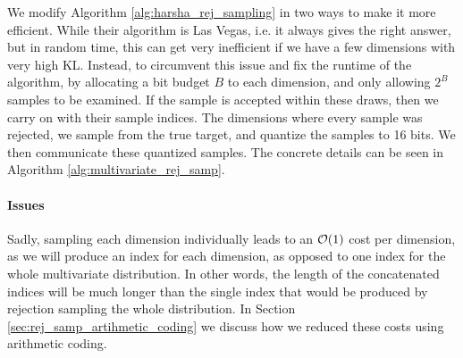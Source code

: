 \par
We modify Algorithm \ref{alg:harsha_rej_sampling} in two ways to make it more
efficient. While their algorithm is Las Vegas, i.e. it always gives the right
answer, but in random time, this can get very inefficient if we have a few
dimensions with very high KL. Instead, to circumvent this issue and fix the
runtime of the algorithm, by allocating a bit budget $B$ to each dimension, and
only allowing $2^B$ samples to be examined. If the sample is accepted within
these draws, then we carry on with their sample indices. The
dimensions where every sample was rejected, we sample from the true target,
and quantize the samples to 16 bits. We then communicate these quantized
samples. The concrete details can be seen in Algorithm
\ref{alg:multivariate_rej_samp}.

\paragraph{Issues} Sadly, sampling each dimension individually leads to an
$\mathcal{O}(1)$ cost per dimension, as we will produce an index for each dimension, as
opposed to one index for the whole multivariate distribution. In other words,
the length of the concatenated indices will be much longer than the single index
that would be produced by rejection sampling the whole distribution. In Section
\ref{sec:rej_samp_artihmetic_coding} we discuss how we reduced these costs using
arithmetic coding.

